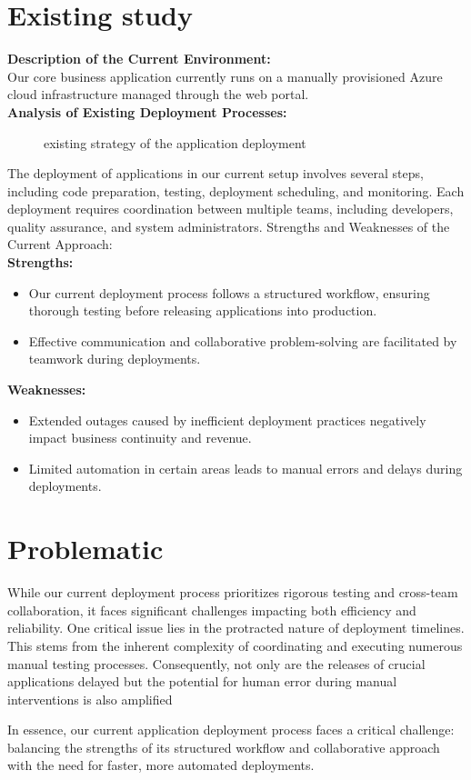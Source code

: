\section{Existing study}

\noindent
\textbf{Description of the Current Environment:}
\\
Our core business application currently runs on a manually provisioned Azure cloud infrastructure managed through the web portal.
\\
\textbf{Analysis of Existing Deployment Processes:}

\begin{figure}[htpb]
    \centering
    \caption{existing strategy of the application deployment}
    \label{fig:existing_strategy}
\end{figure}

The deployment of applications in our current setup involves several steps, including code preparation, testing, deployment scheduling, and monitoring. Each deployment requires coordination between multiple teams, including developers, quality assurance, and system administrators.
Strengths and Weaknesses of the Current Approach:
\\
\textbf{Strengths:}
\begin{itemize}
    \item Our current deployment process follows a structured workflow, ensuring thorough testing before releasing applications into production.
    \item Effective communication and collaborative problem-solving are facilitated by teamwork during deployments.
\end{itemize}
\textbf{Weaknesses:}
\begin{itemize}
    \item Extended outages caused by inefficient deployment practices negatively impact business continuity and revenue.
    \item Limited automation in certain areas leads to manual errors and delays during deployments.
\end{itemize}

\section{Problematic}
While our current deployment process prioritizes rigorous testing and cross-team collaboration, it faces significant challenges impacting both efficiency and reliability. One critical issue lies in the protracted nature of deployment timelines. This stems from the inherent complexity of coordinating and executing numerous manual testing processes. Consequently, not only are the releases of crucial applications delayed but the potential for human error during manual interventions is also amplified
\par
In essence, our current application deployment process faces a critical challenge: balancing the strengths of its structured workflow and collaborative approach with the need for faster, more automated deployments.

